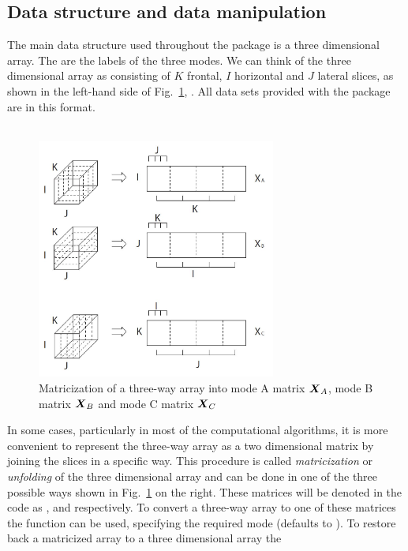 \documentclass[article,shortnames, nojss]{jss}
\newcommand{\vv}[1]{\mbox{\boldmath$#1$}}
\begin{document}
\subsection{Data structure and data manipulation}
\label{sec:structure}
The main data structure used throughout the package is a three
dimensional array. The  are the labels of the three modes.
We can think of the three dimensional array as consisting of $K$ frontal,
$I$ horizontal and $J$ lateral slices, as shown in the left-hand side of
Fig.~\ref{fig-matricization}, \citep[see][]{kiers2000towards}. All data
sets provided with the package are in this format.\\\\
\begin{figure}[H]
\centering
\includegraphics[width=0.7\textwidth]{matricization}
\caption{ Matricization of a three-way array into mode A matrix
$\vv{X}_A$, mode B matrix $\vv{X}_B$ and mode C matrix $\vv{X}_C$}
\label{fig-matricization}
\end{figure}
In some cases, particularly in most of the computational algorithms,
it is more convenient to represent the three-way array as a two dimensional
matrix by joining the slices in a specific way. This procedure is called
\emph{matricization} or \emph{unfolding} of the three dimensional array
and can be done in one of the three possible ways shown in
Fig.~\ref{fig-matricization} on the right. These matrices will be denoted in the code as
,  and  respectively. To convert
a three-way array to one of these matrices the function 
can be used, specifying the required mode (defaults to ).
To restore back a matricized array to a three dimensional array the
\end{document}
